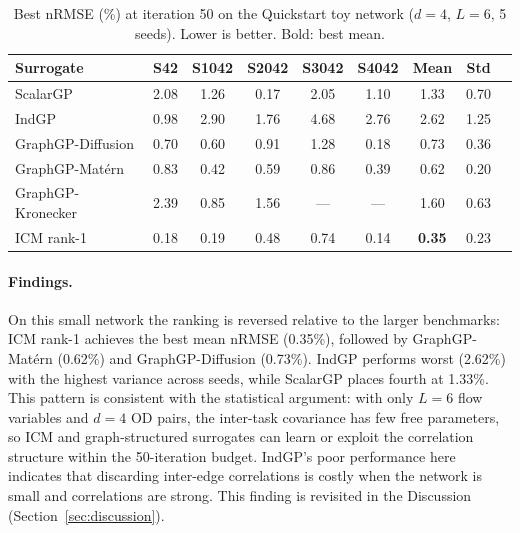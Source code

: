 \documentclass[11pt]{article}
\begin{document}
\begin{table}[h]
\centering
\caption{Best nRMSE (\%) at iteration 50 on the Quickstart toy network
($d=4$, $L=6$, 5 seeds). Lower is better. Bold: best mean.}
\label{tab:quickstart_results}
\begin{tabular}{lcccccc|cc}
\toprule
\textbf{Surrogate} & S42 & S1042 & S2042 & S3042 & S4042 & \textbf{Mean} & \textbf{Std} \\
\midrule
ScalarGP              & 2.08 & 1.26 & 0.17 & 2.05 & 1.10 & 1.33 & 0.70 \\
IndGP                 & 0.98 & 2.90 & 1.76 & 4.68 & 2.76 & 2.62 & 1.25 \\
GraphGP-Diffusion     & 0.70 & 0.60 & 0.91 & 1.28 & 0.18 & 0.73 & 0.36 \\
GraphGP-Mat\'ern      & 0.83 & 0.42 & 0.59 & 0.86 & 0.39 & 0.62 & 0.20 \\
GraphGP-Kronecker     & 2.39 & 0.85 & 1.56 & ---  & ---  & 1.60 & 0.63 \\
ICM rank-1            & 0.18 & 0.19 & 0.48 & 0.74 & 0.14 & \textbf{0.35} & 0.23 \\
\bottomrule
\end{tabular}
\end{table}





\paragraph{Findings.}
On this small network the ranking is reversed relative to the larger benchmarks:
ICM rank-1 achieves the best mean nRMSE (0.35\%), followed by GraphGP-Mat\'ern
(0.62\%) and GraphGP-Diffusion (0.73\%). IndGP performs worst (2.62\%) with the
highest variance across seeds, while ScalarGP places fourth at 1.33\%.
This pattern is consistent with the statistical argument: with only $L=6$ flow
variables and $d=4$ OD pairs, the inter-task covariance has few free parameters,
so ICM and graph-structured surrogates can learn or exploit the correlation
structure within the 50-iteration budget. IndGP's poor performance here indicates
that discarding inter-edge correlations is costly when the network is small and
correlations are strong. This finding is revisited in the Discussion
(Section~\ref{sec:discussion}).
\end{document}
